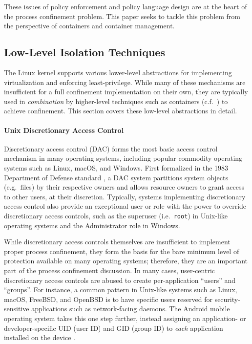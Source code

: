 These issues of policy enforcement and policy language design are at the heart of the process confinement problem. This paper seeks to tackle this problem from the perspective of containers and container management.

\subsection{Low-Level Isolation Techniques}
\label{subsection:low_level}

The Linux kernel supports various lower-level abstractions for implementing virtualization and enforcing least-privilege. While many of these mechanisms are insufficient for a full confinement implementation on their own, they are typically used in \textit{combination} by higher-level techniques such as containers (c.f.~) to achieve confinement. This section covers these low-level abstractions in detail.


\paragraph*{Unix Discretionary Access Control}

Discretionary access control (DAC) forms the most basic access control mechanism in many operating systems, including popular commodity operating systems such as Linux, macOS, and Windows.  First formalized in the 1983 Department of Defense standard \cite{orange_book}, a DAC system partitions system objects (e.g.~files) by their respective owners and allows resource owners to grant access to other users, at their discretion.  Typically, systems implementing discretionary access control also provide an exceptional user or role with the power to override discretionary access controls, such as the superuser (i.e.~\texttt{root}) in Unix-like operating systems and the Administrator role in Windows.

While discretionary access controls themselves are insufficient to implement proper process confinement, they form the basis for the bare minimum level of protection available on many operating systems; therefore, they are an important part of the process confinement discussion. In many cases, user-centric discretionary access controls are abused to create per-application \enquote{users} and \enquote{groups}. For instance, a common pattern in Unix-like systems such as Linux, macOS, FreeBSD, and OpenBSD is to have specific users reserved for security-sensitive applications such as network-facing daemons. The Android mobile operating system takes this one step further, instead assigning an application- or developer-specific UID (user ID) and GID (group ID) to \textit{each} application installed on the device \cite{android_security}.

